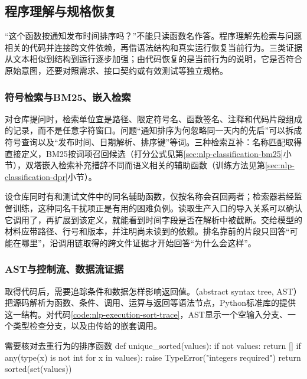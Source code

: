 \subsection{程序理解与规格恢复}
\label{sec:nlp-execution-understanding}

“这个函数按通知发布时间排序吗？”不能只读函数名作答。程序理解先检索与问题相关的代码并连接跨文件依赖，再借语法结构和真实运行恢复当前行为。三类证据从文本相似到结构到运行逐步加强；由代码恢复的是当前行为的说明，它是否符合原始意图，还要对照需求、接口契约或有效测试等独立规格。

\subsubsection{符号检索与BM25、嵌入检索}
\label{sec:nlp-execution-code-retrieval}

对仓库提问时，检索单位宜是路径、限定符号名、函数签名、注释和代码片段组成的记录，而不是任意字符窗口。问题“通知排序为何忽略同一天内的先后”可以拆成符号查询以及“发布时间、日期解析、排序键”等词。三种检索互补：名称匹配取得直接定义，BM25按词项召回候选（打分公式见第\ref{sec:nlp-classification-bm25}小节），双塔嵌入检索补充措辞不同而语义相关的辅助函数（训练方法见第\ref{sec:nlp-classification-dpr}小节）。

设仓库同时有和测试文件中的同名辅助函数，仅按名称会召回两者；检索器若经监督训练，这种同名干扰项正是有用的困难负例。读取生产入口的导入关系可以确认它调用了，再扩展到该定义，就能看到时间字段是否在解析中被截断。交给模型的材料应带路径、行号和版本，并注明尚未读到的依赖。排名靠前的片段只回答“可能在哪里”，沿调用链取得的跨文件证据才开始回答“为什么会这样”。

\subsubsection{AST与控制流、数据流证据}
\label{sec:nlp-execution-ast}

取得代码后，需要追踪条件和数据怎样影响返回值。（abstract syntax tree, AST）把源码解析为函数、条件、调用、运算与返回等语法节点，Python标准库的提供这一结构。对代码\ref{code:nlp-execution-sort-trace}，AST显示一个空输入分支、一个类型检查分支，以及由传给的嵌套调用。

\begin{codeblock}[language=Python,label={code:nlp-execution-sort-trace}]{需要核对去重行为的排序函数}
def unique_sorted(values):
    if not values:
        return []
    if any(type(x) is not int for x in values):
        raise TypeError("integers required")
    return sorted(set(values))
\end{codeblock}


